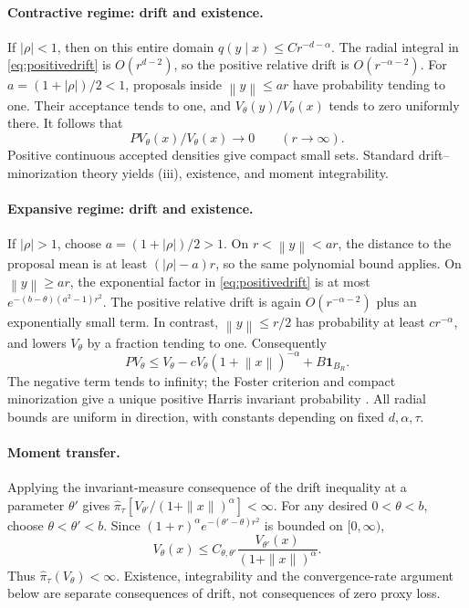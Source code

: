 \documentclass[pdflatex,iicol,sn-mathphys-ay]{sn-jnl}
\theoremstyle{definition}\newtheorem{definition}[theorem]{Definition}
\theoremstyle{remark}\newtheorem{remark}[theorem]{Remark}
\numberwithin{equation}{section}
\newcommand{\norm}[1]{\left\lVert#1\right\rVert}\newcommand{\TV}{\mathrm{TV}}
\newcommand{\1}{\mathbf 1}
\begin{document}
\paragraph{Contractive regime: drift and existence.} If $|\rho|<1$, then on this entire domain $q(y\mid x)\le Cr^{-d-\alpha}$. The radial integral in \eqref{eq:positivedrift} is $O(r^{d-2})$, so the positive relative drift is $O(r^{-\alpha-2})$. For $a=(1+|\rho|)/2<1$, proposals inside $\norm y\le ar$ have probability tending to one. Their acceptance tends to one, and $V_\theta(y)/V_\theta(x)$ tends to zero uniformly there. It follows that
\begin{equation}
PV_\theta(x)/V_\theta(x)\longrightarrow0\qquad(r\to\infty).\label{eq:contractiveexponential}
\end{equation}
Positive continuous accepted densities give compact small sets. Standard drift--minorization theory \citep{roberts} yields (iii), existence, and moment integrability.

\paragraph{Expansive regime: drift and existence.} If $|\rho|>1$, choose $a=(1+|\rho|)/2>1$. On $r<\norm y<ar$, the distance to the proposal mean is at least $(|\rho|-a)r$, so the same polynomial bound applies. On $\norm y\ge ar$, the exponential factor in \eqref{eq:positivedrift} is at most $e^{-(b-\theta)(a^2-1)r^2}$. The positive relative drift is again $O(r^{-\alpha-2})$ plus an exponentially small term. In contrast, $\norm y\le r/2$ has probability at least $cr^{-\alpha}$, and lowers $V_\theta$ by a fraction tending to one. Consequently
\begin{equation}
PV_\theta\le V_\theta-cV_\theta(1+\norm x)^{-\alpha}+B\1_{B_R}.\label{eq:expansivedrift}
\end{equation}
The negative term tends to infinity; the Foster criterion and compact minorization give a unique positive Harris invariant probability \citep{douc}. All radial bounds are uniform in direction, with constants depending on fixed $d,\alpha,\tau$.

\paragraph{Moment transfer.} Applying the invariant-measure consequence of the drift inequality at a parameter $\theta'$ gives $\widehat\pi_\tau[V_{\theta'}/(1+\|x\|)^\alpha]<\infty$. For any desired $0<\theta<b$, choose $\theta<\theta'<b$. Since $(1+r)^\alpha e^{-(\theta'-\theta)r^2}$ is bounded on $[0,\infty)$,
\[
 V_\theta(x)\le C_{\theta,\theta'}\frac{V_{\theta'}(x)}{(1+\|x\|)^\alpha}.
\]
Thus $\widehat\pi_\tau(V_\theta)<\infty$. Existence, integrability and the convergence-rate argument below are separate consequences of drift, not consequences of zero proxy loss.
\end{document}
